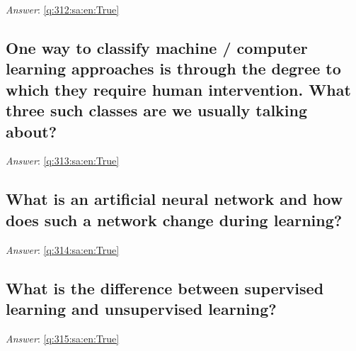 \documentclass[a4paper,11pt,oneside]{article}
\begin{document}
\begin{sloppypar}
\vspace{1cm}

\textit{Answer}: \autoref{q:312:sa:en:True}



\subsection{One way to classify machine / computer learning approaches is through the degree to which they require human intervention. What three such classes are we usually talking about?}

\label{q:313:sa:en:False}

\vspace{2cm}

\noindent\makebox[\textwidth]{\hrulefill}

\vspace{1cm}

\textit{Answer}: \autoref{q:313:sa:en:True}



\subsection{What is an artificial neural network and how does such a network change during learning?}

\label{q:314:sa:en:False}

\vspace{2cm}

\noindent\makebox[\textwidth]{\hrulefill}

\vspace{1cm}

\textit{Answer}: \autoref{q:314:sa:en:True}



\subsection{What is the difference between supervised learning and unsupervised learning?}

\label{q:315:sa:en:False}

\vspace{2cm}

\noindent\makebox[\textwidth]{\hrulefill}

\vspace{1cm}

\textit{Answer}: \autoref{q:315:sa:en:True}




\end{sloppypar}
\end{document}

